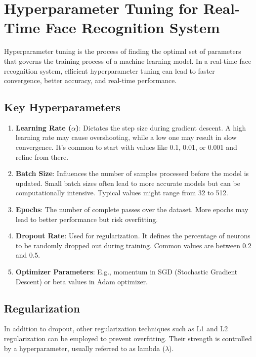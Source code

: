 \section{Hyperparameter Tuning for Real-Time Face Recognition System}

	Hyperparameter tuning is the process of finding the optimal set of parameters that governs the training process of a machine learning model. In a real-time face recognition system, efficient hyperparameter tuning can lead to faster convergence, better accuracy, and real-time performance.
	
	\subsection{Key Hyperparameters}
		\begin{enumerate}
			\item \textbf{Learning Rate ($\alpha$)}: Dictates the step size during gradient descent. A high learning rate may cause overshooting, while a low one may result in slow convergence. It's common to start with values like 0.1, 0.01, or 0.001 and refine from there.
			
			\item \textbf{Batch Size}: Influences the number of samples processed before the model is updated. Small batch sizes often lead to more accurate models but can be computationally intensive. Typical values might range from 32 to 512.
			
			\item \textbf{Epochs}: The number of complete passes over the dataset. More epochs may lead to better performance but risk overfitting.
			
			\item \textbf{Dropout Rate}: Used for regularization. It defines the percentage of neurons to be randomly dropped out during training. Common values are between 0.2 and 0.5.
			
			\item \textbf{Optimizer Parameters}: E.g., momentum in SGD (Stochastic Gradient Descent) or beta values in Adam optimizer.
		\end{enumerate}
	
	\subsection{Regularization}
		In addition to dropout, other regularization techniques such as L1 and L2 regularization can be employed to prevent overfitting. Their strength is controlled by a hyperparameter, usually referred to as lambda ($\lambda$).
	
